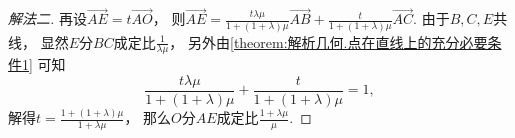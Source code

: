 \begin{example}
\begin{solution}
\begin{proof}[解法二]
再设\(\vec{AE} = t \vec{AO}\)，
则\(
	\vec{AE}
	= \frac{t \lambda\mu}{1+(1+\lambda)\mu} \vec{AB}
	+ \frac{t}{1+(1+\lambda)\mu} \vec{AC}
\).
由于\(B,C,E\)共线，
显然\(E\)分\(BC\)成定比\(
	\frac{1}{\lambda\mu}
\)，
另外由\cref{theorem:解析几何.点在直线上的充分必要条件1} 可知\begin{equation*}
	\frac{t \lambda\mu}{1+(1+\lambda)\mu}
	+ \frac{t}{1+(1+\lambda)\mu}
	= 1,
\end{equation*}
解得\(t = \frac{1+(1+\lambda)\mu}{1+\lambda\mu}\)，
那么\(O\)分\(AE\)成定比\(
	\frac{1+\lambda\mu}{\mu}
\).
\end{proof}
\end{solution}
\end{example}
